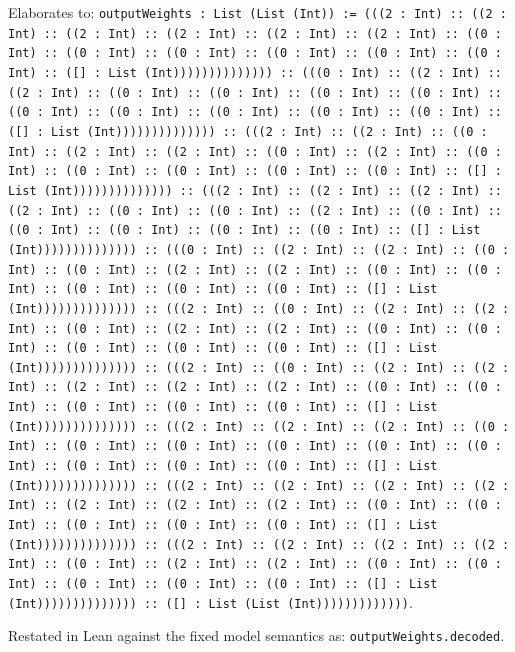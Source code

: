 \documentclass[11pt]{article}
\begin{document}
\noindent Elaborates to: \texttt{outputWeights : List (List (Int)) := (((2 : Int) :: ((2 : Int) :: ((2 : Int) :: ((2 : Int) :: ((2 : Int) :: ((2 : Int) :: ((0 : Int) :: ((0 : Int) :: ((0 : Int) :: ((0 : Int) :: ((0 : Int) :: ((0 : Int) :: ([] : List (Int)))))))))))))) :: (((0 : Int) :: ((2 : Int) :: ((2 : Int) :: ((0 : Int) :: ((0 : Int) :: ((0 : Int) :: ((0 : Int) :: ((0 : Int) :: ((0 : Int) :: ((0 : Int) :: ((0 : Int) :: ((0 : Int) :: ([] : List (Int)))))))))))))) :: (((2 : Int) :: ((2 : Int) :: ((0 : Int) :: ((2 : Int) :: ((2 : Int) :: ((0 : Int) :: ((2 : Int) :: ((0 : Int) :: ((0 : Int) :: ((0 : Int) :: ((0 : Int) :: ((0 : Int) :: ([] : List (Int)))))))))))))) :: (((2 : Int) :: ((2 : Int) :: ((2 : Int) :: ((2 : Int) :: ((0 : Int) :: ((0 : Int) :: ((2 : Int) :: ((0 : Int) :: ((0 : Int) :: ((0 : Int) :: ((0 : Int) :: ((0 : Int) :: ([] : List (Int)))))))))))))) :: (((0 : Int) :: ((2 : Int) :: ((2 : Int) :: ((0 : Int) :: ((0 : Int) :: ((2 : Int) :: ((2 : Int) :: ((0 : Int) :: ((0 : Int) :: ((0 : Int) :: ((0 : Int) :: ((0 : Int) :: ([] : List (Int)))))))))))))) :: (((2 : Int) :: ((0 : Int) :: ((2 : Int) :: ((2 : Int) :: ((0 : Int) :: ((2 : Int) :: ((2 : Int) :: ((0 : Int) :: ((0 : Int) :: ((0 : Int) :: ((0 : Int) :: ((0 : Int) :: ([] : List (Int)))))))))))))) :: (((2 : Int) :: ((0 : Int) :: ((2 : Int) :: ((2 : Int) :: ((2 : Int) :: ((2 : Int) :: ((2 : Int) :: ((0 : Int) :: ((0 : Int) :: ((0 : Int) :: ((0 : Int) :: ((0 : Int) :: ([] : List (Int)))))))))))))) :: (((2 : Int) :: ((2 : Int) :: ((2 : Int) :: ((0 : Int) :: ((0 : Int) :: ((0 : Int) :: ((0 : Int) :: ((0 : Int) :: ((0 : Int) :: ((0 : Int) :: ((0 : Int) :: ((0 : Int) :: ([] : List (Int)))))))))))))) :: (((2 : Int) :: ((2 : Int) :: ((2 : Int) :: ((2 : Int) :: ((2 : Int) :: ((2 : Int) :: ((2 : Int) :: ((0 : Int) :: ((0 : Int) :: ((0 : Int) :: ((0 : Int) :: ((0 : Int) :: ([] : List (Int)))))))))))))) :: (((2 : Int) :: ((2 : Int) :: ((2 : Int) :: ((2 : Int) :: ((0 : Int) :: ((2 : Int) :: ((2 : Int) :: ((0 : Int) :: ((0 : Int) :: ((0 : Int) :: ((0 : Int) :: ((0 : Int) :: ([] : List (Int)))))))))))))) :: ([] : List (List (Int)))))))))))))}.\par
\noindent Restated in Lean against the fixed model semantics as: \texttt{outputWeights.decoded}.\par
\end{document}
